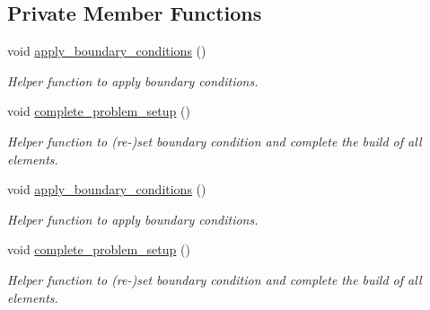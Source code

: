 \subsection*{Private Member Functions}
\begin{DoxyCompactItemize}
\item 
void \hyperlink{classUnstructuredPoissonProblem_ace8b8b3097ae2024a0589b2bf9b4ee7b}{apply\+\_\+boundary\+\_\+conditions} ()
\begin{DoxyCompactList}\small\item\em Helper function to apply boundary conditions. \end{DoxyCompactList}\item 
void \hyperlink{classUnstructuredPoissonProblem_a5cbf00790e8469b43c64c6aaadfe7b41}{complete\+\_\+problem\+\_\+setup} ()
\begin{DoxyCompactList}\small\item\em Helper function to (re-\/)set boundary condition and complete the build of all elements. \end{DoxyCompactList}\item 
void \hyperlink{classUnstructuredPoissonProblem_ace8b8b3097ae2024a0589b2bf9b4ee7b}{apply\+\_\+boundary\+\_\+conditions} ()
\begin{DoxyCompactList}\small\item\em Helper function to apply boundary conditions. \end{DoxyCompactList}\item 
void \hyperlink{classUnstructuredPoissonProblem_a5cbf00790e8469b43c64c6aaadfe7b41}{complete\+\_\+problem\+\_\+setup} ()
\begin{DoxyCompactList}\small\item\em Helper function to (re-\/)set boundary condition and complete the build of all elements. \end{DoxyCompactList}\end{DoxyCompactItemize}
